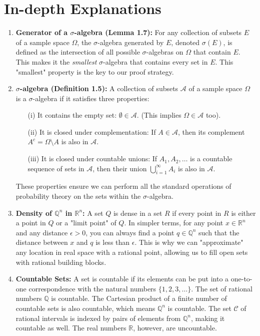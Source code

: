 \documentclass[11pt,a4paper]{article}
\theoremstyle{tutorstyle}
\begin{document}
\newpage
\section*{In-depth Explanations}
\begin{enumerate}
    \item \label{concept:generator} \textbf{Generator of a $\sigma$-algebra (Lemma 1.7):} For any collection of subsets $E$ of a sample space $\Omega$, the $\sigma$-algebra generated by $E$, denoted $\sigma(E)$, is defined as the intersection of all possible $\sigma$-algebras on $\Omega$ that contain $E$. This makes it the \textit{smallest} $\sigma$-algebra that contains every set in $E$. This "smallest" property is the key to our proof strategy.

    \item \label{concept:sigma-algebra} \textbf{$\sigma$-algebra (Definition 1.5):} A collection of subsets $\mathcal{A}$ of a sample space $\Omega$ is a $\sigma$-algebra if it satisfies three properties:
        \begin{itemize}
            \item[(i)] It contains the empty set: $\emptyset \in \mathcal{A}$. (This implies $\Omega \in \mathcal{A}$ too).
            \item[(ii)] It is closed under complementation: If $A \in \mathcal{A}$, then its complement $A^c = \Omega \setminus A$ is also in $\mathcal{A}$.
            \item[(iii)] It is closed under countable unions: If $A_1, A_2, \dots$ is a countable sequence of sets in $\mathcal{A}$, then their union $\bigcup_{i=1}^\infty A_i$ is also in $\mathcal{A}$.
        \end{itemize}
    These properties ensure we can perform all the standard operations of probability theory on the sets within the $\sigma$-algebra.

    \item \label{concept:dense} \textbf{Density of $\mathbb{Q}^n$ in $\mathbb{R}^n$:} A set $Q$ is dense in a set $R$ if every point in $R$ is either a point in $Q$ or a "limit point" of $Q$. In simpler terms, for any point $x \in \mathbb{R}^n$ and any distance $\epsilon > 0$, you can always find a point $q \in \mathbb{Q}^n$ such that the distance between $x$ and $q$ is less than $\epsilon$. This is why we can "approximate" any location in real space with a rational point, allowing us to fill open sets with rational building blocks.

    \item \label{concept:countable} \textbf{Countable Sets:} A set is countable if its elements can be put into a one-to-one correspondence with the natural numbers $\{1, 2, 3, \dots\}$. The set of rational numbers $\mathbb{Q}$ is countable. The Cartesian product of a finite number of countable sets is also countable, which means $\mathbb{Q}^n$ is countable. The set $\mathcal{C}$ of rational intervals is indexed by pairs of elements from $\mathbb{Q}^n$, making it countable as well. The real numbers $\mathbb{R}$, however, are uncountable.
\end{enumerate}
\end{document}
